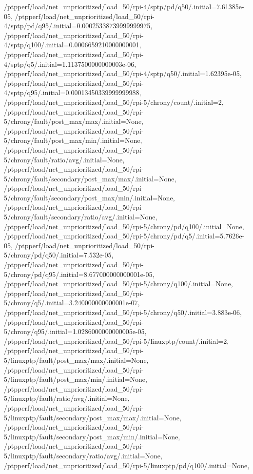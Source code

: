 {    /ptpperf/load/net_unprioritized/load_50/rpi-4/sptp/pd/q50/.initial=7.61385e-05,
    /ptpperf/load/net_unprioritized/load_50/rpi-4/sptp/pd/q95/.initial=0.00025338739999999975,
    /ptpperf/load/net_unprioritized/load_50/rpi-4/sptp/q100/.initial=0.0006659210000000001,
    /ptpperf/load/net_unprioritized/load_50/rpi-4/sptp/q5/.initial=1.1137500000000003e-06,
    /ptpperf/load/net_unprioritized/load_50/rpi-4/sptp/q50/.initial=1.62395e-05,
    /ptpperf/load/net_unprioritized/load_50/rpi-4/sptp/q95/.initial=0.00013450339999999988,
    /ptpperf/load/net_unprioritized/load_50/rpi-5/chrony/count/.initial=2,
    /ptpperf/load/net_unprioritized/load_50/rpi-5/chrony/fault/post_max/max/.initial=None,
    /ptpperf/load/net_unprioritized/load_50/rpi-5/chrony/fault/post_max/min/.initial=None,
    /ptpperf/load/net_unprioritized/load_50/rpi-5/chrony/fault/ratio/avg/.initial=None,
    /ptpperf/load/net_unprioritized/load_50/rpi-5/chrony/fault/secondary/post_max/max/.initial=None,
    /ptpperf/load/net_unprioritized/load_50/rpi-5/chrony/fault/secondary/post_max/min/.initial=None,
    /ptpperf/load/net_unprioritized/load_50/rpi-5/chrony/fault/secondary/ratio/avg/.initial=None,
    /ptpperf/load/net_unprioritized/load_50/rpi-5/chrony/pd/q100/.initial=None,
    /ptpperf/load/net_unprioritized/load_50/rpi-5/chrony/pd/q5/.initial=5.7626e-05,
    /ptpperf/load/net_unprioritized/load_50/rpi-5/chrony/pd/q50/.initial=7.532e-05,
    /ptpperf/load/net_unprioritized/load_50/rpi-5/chrony/pd/q95/.initial=8.677000000000001e-05,
    /ptpperf/load/net_unprioritized/load_50/rpi-5/chrony/q100/.initial=None,
    /ptpperf/load/net_unprioritized/load_50/rpi-5/chrony/q5/.initial=3.240000000000001e-07,
    /ptpperf/load/net_unprioritized/load_50/rpi-5/chrony/q50/.initial=3.883e-06,
    /ptpperf/load/net_unprioritized/load_50/rpi-5/chrony/q95/.initial=1.0286000000000005e-05,
    /ptpperf/load/net_unprioritized/load_50/rpi-5/linuxptp/count/.initial=2,
    /ptpperf/load/net_unprioritized/load_50/rpi-5/linuxptp/fault/post_max/max/.initial=None,
    /ptpperf/load/net_unprioritized/load_50/rpi-5/linuxptp/fault/post_max/min/.initial=None,
    /ptpperf/load/net_unprioritized/load_50/rpi-5/linuxptp/fault/ratio/avg/.initial=None,
    /ptpperf/load/net_unprioritized/load_50/rpi-5/linuxptp/fault/secondary/post_max/max/.initial=None,
    /ptpperf/load/net_unprioritized/load_50/rpi-5/linuxptp/fault/secondary/post_max/min/.initial=None,
    /ptpperf/load/net_unprioritized/load_50/rpi-5/linuxptp/fault/secondary/ratio/avg/.initial=None,
    /ptpperf/load/net_unprioritized/load_50/rpi-5/linuxptp/pd/q100/.initial=None,
}
